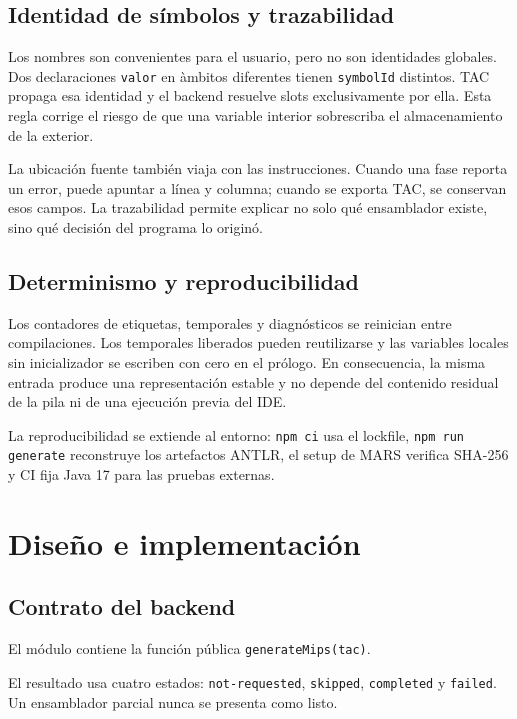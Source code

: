 \documentclass[11pt,letterpaper,oneside]{report}
\newcommand{\codigo}[1]{\texttt{#1}}
\newcommand{\archivo}[1]{\path{#1}}
\begin{document}
\section{Identidad de s\'imbolos y trazabilidad}

Los nombres son convenientes para el usuario, pero no son identidades globales. Dos declaraciones \codigo{valor} en \`ambitos diferentes tienen \codigo{symbolId} distintos. TAC propaga esa identidad y el backend resuelve slots exclusivamente por ella. Esta regla corrige el riesgo de que una variable interior sobrescriba el almacenamiento de la exterior.

La ubicaci\'on fuente tambi\'en viaja con las instrucciones. Cuando una fase reporta un error, puede apuntar a l\'inea y columna; cuando se exporta TAC, se conservan esos campos. La trazabilidad permite explicar no solo qu\'e ensamblador existe, sino qu\'e decisi\'on del programa lo origin\'o.

\section{Determinismo y reproducibilidad}

Los contadores de etiquetas, temporales y diagn\'osticos se reinician entre compilaciones. Los temporales liberados pueden reutilizarse y las variables locales sin inicializador se escriben con cero en el pr\'ologo. En consecuencia, la misma entrada produce una representaci\'on estable y no depende del contenido residual de la pila ni de una ejecuci\'on previa del IDE.

La reproducibilidad se extiende al entorno: \codigo{npm ci} usa el lockfile, \codigo{npm run generate} reconstruye los artefactos ANTLR, el setup de MARS verifica SHA-256 y CI fija Java 17 para las pruebas externas.

\chapter{Dise\~no e implementaci\'on}

\section{Contrato del backend}

El m\'odulo \archivo{src/mips/generator.ts} contiene la funci\'on p\'ublica \codigo{generateMips(tac)}.

El resultado usa cuatro estados: \codigo{not-requested}, \codigo{skipped}, \codigo{completed} y \codigo{failed}. Un ensamblador parcial nunca se presenta como listo.
\end{document}
